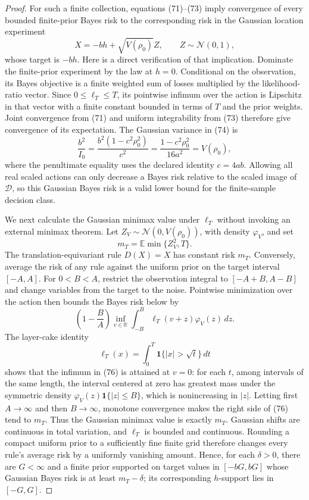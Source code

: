 \documentclass{article}
\begin{document}
\begin{proof}
For such a finite collection, equations (71)--(73) imply convergence
of every bounded finite-prior Bayes risk to the corresponding risk in
the Gaussian location experiment
\[
 X=-bh+\sqrt{V(\rho_0)}Z,
 \qquad Z\sim\mathcal N(0,1),
 \tag{74}
\]
whose target is \(-bh\).  Here is a direct verification of that
implication.  Dominate the finite-prior experiment by the law at
\(h=0\).  Conditional on the observation, its Bayes objective is a
finite weighted sum of losses multiplied by the likelihood-ratio
vector.  Since \(0\le\ell_T\le T\), its pointwise infimum over the
action is Lipschitz in that vector with a finite constant bounded in
terms of \(T\) and the prior weights.  Joint convergence from (71) and
uniform integrability from (73) therefore give convergence of its
expectation.  The Gaussian variance in (74) is
\[
 \frac{b^2}{I_0}
 =\frac{b^2(1-c^2\rho_0^2)}{c^2}
 =\frac{1-c^2\rho_0^2}{16a^2}
 =V(\rho_0),
 \tag{75}
\]
where the penultimate equality uses the declared identity \(c=4ab\).
Allowing all real scaled actions can only decrease a Bayes risk relative
to the scaled image of \(\mathcal D\), so this Gaussian Bayes risk is a
valid lower bound for the finite-sample decision class.

We next calculate the Gaussian minimax value under \(\ell_T\) without
invoking an external minimax theorem.  Let
\(Z_V\sim\mathcal N(0,V(\rho_0))\), with density \(\varphi_V\), and set
\[
 m_T=\mathbb E\min\{Z_V^2,T\}.
\]
The translation-equivariant rule \(D(X)=X\) has constant risk \(m_T\).
Conversely, average the risk of any rule against the uniform prior on
the target interval \([-A,A]\).  For \(0<B<A\), restrict the observation
integral to \([-A+B,A-B]\) and change variables from the target to the
noise.  Pointwise minimization over the action then bounds the Bayes risk
below by
\[
 \left(1-\frac BA\right)
 \inf_{v\in\mathbb R}
 \int_{-B}^{B}\ell_T(v+z)\varphi_V(z)\,dz.
 \tag{76}
\]
The layer-cake identity
\[
 \ell_T(x)=\int_0^T\mathbf 1\{|x|>\sqrt t\}\,dt
\]
shows that the infimum in (76) is attained at \(v=0\): for each
\(t\), among intervals of the same length, the interval centered at zero
has greatest mass under the symmetric density
\(\varphi_V(z)\mathbf 1\{|z|\le B\}\), which is nonincreasing in
\(|z|\).  Letting first \(A\to\infty\) and then \(B\to\infty\), monotone
convergence makes the right side of (76) tend to \(m_T\).  Thus the
Gaussian minimax value is exactly \(m_T\).  Gaussian shifts are
continuous in total variation, and \(\ell_T\) is bounded and continuous.
Rounding a compact uniform prior to a sufficiently fine finite grid
therefore changes every rule's average risk by a uniformly vanishing
amount.  Hence, for each \(\delta>0\), there are \(G<\infty\) and a
finite prior supported on target values in \([-bG,bG]\) whose Gaussian
Bayes risk is at least \(m_T-\delta\); its corresponding \(h\)-support
lies in \([-G,G]\).


\end{proof}
\end{document}
